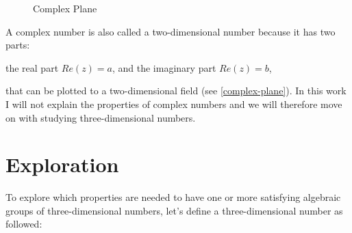 \documentclass[a4paper,english,parskip]{scrartcl}
\begin{document}
	
	\begin{wrapfigure}[7]{r}{.3\textwidth}
	\vspace{-10pt}
	\caption{Complex Plane}
	\label{complex-plane}
	\end{wrapfigure}
	
	A complex number is also called a two-dimensional number because it has two parts: 
	
	\vspace{-15pt}
	the real part $Re(z) = a$, and the imaginary part $Re(z) = b$, 
	
	\vspace{-15pt}
	that can be plotted to a two-dimensional field (see \autoref{complex-plane}).
	In this work I will not explain the properties of complex numbers and we will therefore move on with 
	studying three-dimensional numbers.
	
	\vspace{15pt}
	
	
	\newpage
	\section{Exploration}
	
To explore which properties are needed to have one or more satisfying algebraic groups of three-dimensional numbers, let's define a three-dimensional number as followed:
\end{document}
